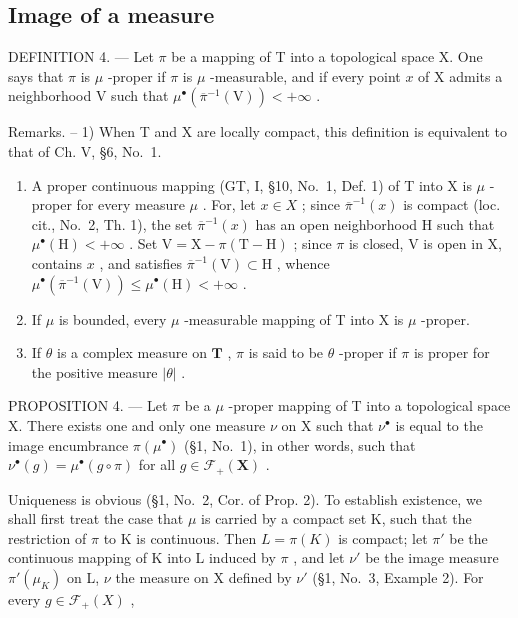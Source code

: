 \subsection{Image of a measure}

DEFINITION 4. --- Let \(\pi\) be a mapping of T into a topological space X. One says that \(\pi\) is \(\mu\) -proper if \(\pi\) is \(\mu\) -measurable, and if every point \(x\) of X admits a neighborhood V such that \(\mu^{\bullet}\left(\overline{\pi}^{-1}(\mathrm{V})\right) < +\infty\) .

Remarks. -- 1) When T and X are locally compact, this definition is equivalent to that of Ch. V, §6, No.~1.

\begin{enumerate}
\def\labelenumi{\arabic{enumi})}
\setcounter{enumi}{1}
\item
  A proper continuous mapping (GT, I, §10, No.~1, Def. 1) of T into X is \(\mu\) -proper for every measure \(\mu\) . For, let \(x \in X\) ; since \(\overline{\pi}^{-1}(x)\) is compact (loc. cit., No.~2, Th. 1), the set \(\overline{\pi}^{-1}(x)\) has an open neighborhood H such that \(\mu^{\bullet}(\mathrm{H}) < +\infty\) . Set \(\mathrm{V} = \mathrm{X} - \pi(\mathrm{T} - \mathrm{H})\) ; since \(\pi\) is closed, V is open in X, contains \(x\) , and satisfies \(\overline{\pi}^{-1}(\mathrm{V}) \subset \mathrm{H}\) , whence \(\mu^{\bullet}(\overline{\pi}^{-1}(\mathrm{V})) \leqslant \mu^{\bullet}(\mathrm{H}) < +\infty\) .
\item
  If \(\mu\) is bounded, every \(\mu\) -measurable mapping of T into X is \(\mu\) -proper.
\item
  If \(\theta\) is a complex measure on \(\mathbf{T}\) , \(\pi\) is said to be \(\theta\) -proper if \(\pi\) is proper for the positive measure \(|\theta|\) .
\end{enumerate}

PROPOSITION 4. --- Let \(\pi\) be a \(\mu\) -proper mapping of T into a topological space X. There exists one and only one measure \(\nu\) on X such that \(\nu^{\bullet}\) is equal to the image encumbrance \(\pi(\mu^{\bullet})\) (§1, No.~1), in other words, such that \(\nu^{\bullet}(g) = \mu^{\bullet}(g \circ \pi)\) for all \(g \in \mathcal{F}_{+}(\mathbf{X})\) .

Uniqueness is obvious (§1, No.~2, Cor. of Prop. 2). To establish existence, we shall first treat the case that \(\mu\) is carried by a compact set K, such that the restriction of \(\pi\) to K is continuous. Then \(L = \pi(K)\) is compact; let \(\pi'\) be the continuous mapping of K into L induced by \(\pi\) , and let \(\nu'\) be the image measure \(\pi'(\mu_K)\) on L, \(\nu\) the measure on X defined by \(\nu'\) (§1, No.~3, Example 2). For every \(g \in \mathcal{F}_+(X)\) ,

